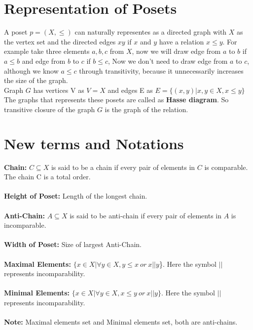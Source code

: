 \section{Representation of Posets}
A poset $p = (X,\leq)$ can naturally representes as a directed graph with $X$ as the vertex set and the directed edges $xy$ if $x$ and $y$ have a relation $x \leq y$. For example take three elements $a, b, c$ from $X$, now we will draw edge from $a$ to $b$ if $a\leq b$ and edge from $b$ to $c$ if $b \leq c$, Now we don't need to draw edge from $a$ to $c$, although we know $a \leq c$ through transitivity, because it unnecessarily increases the size of the graph.\\
Graph $G$ has vertices V as $V = X$ and edges E as $E = \{(x,y) | x,y \in X, x \leq y \}$\\
The graphs that represents these posets are called as \textbf{Hasse diagram}. So transitive closure of the graph $G$ is the graph of the relation.
\section{New terms and Notations}
\textbf{Chain:} $C \subseteq X$ is said to be a chain if every pair of elements in $C$ is comparable. The chain C is a total order.\\\\
\textbf{Height of Poset:} Length of the longest chain.\\\\
\textbf{Anti-Chain:} $A \subseteq X$ is said to be anti-chain if every pair of elements in $A$ is incomparable.\\\\
\textbf{Width of Poset:} Size of largest Anti-Chain.\\\\
\textbf{Maximal Elements:}  $\{x \in X | \forall y \in X, y \leq x ~or~ x || y$\}. Here the symbol $||$ represents incomparability.\\\\
\textbf{Minimal Elements:} $\{x \in X | \forall y \in X, x \leq y ~or~ x || y\}$. Here the symbol $||$ represents incomparability.\\\\
\textbf{Note:} Maximal elements set and Minimal elements set, both are anti-chains.
